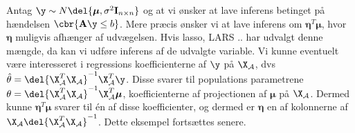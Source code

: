 Antag \(\y \sim N\del{\boldsymbol{\mu}, \sigma^2 \mathbf{I}_{n \times n}}\) og at vi ønsker at lave inferens betinget på hændelsen \(\cbr{\mathbf{A} \y \leq b}\).
Mere præcis ønsker vi at lave inferens om \(\boldsymbol{\eta}^T \boldsymbol{\mu}\), hvor \(\boldsymbol{\eta}\) muligvis afhænger af udvægelsen.
Hvis lasso, LARS .. har udvalgt denne mængde, da kan vi udføre inferens  af de udvalgte variable.
Vi kunne eventuelt være interesseret i regressions koefficienterne af \(\y\) på \(\X_\mathcal{A}\), dvs \(\hat{\theta}= \del{\X_\mathcal{A}^T \X_\mathcal{A}}^{-1} \X_\mathcal{A}^T \y\).
Disse svarer til populations parametrene \(\theta= \del{\X_\mathcal{A}^T \X_\mathcal{A}}^{-1} \X_\mathcal{A}^T \boldsymbol{\mu}\), koefficienterne af projectionen af \(\boldsymbol{\mu}\) på \(\X_\mathcal{A}\).
Dermed kunne \(\boldsymbol{\eta}^T \boldsymbol{\mu}\) svarer til én af disse koefficienter, og dermed er \(\boldsymbol{\eta}\) en af kolonnerne af \(\X_\mathcal{A} \del{\X_\mathcal{A}^T \X_\mathcal{A}}^{-1}\). Dette eksempel fortsættes senere.



